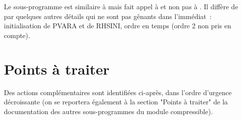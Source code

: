 Le sous-programme  est similaire à  mais fait appel
à  et non pas à .
Il diffère de  par quelques autres détails qui ne sont pas
gênants dans l'immédiat~:
initialisation de PVARA et de RHSINI,
ordre en temps (ordre 2 non pris en compte).

\newpage
\section*{Points à traiter}

Des actions complémentaires sont identifiées ci-après, dans l'ordre
d'urgence décroissante (on se reportera
également à la section "Points à traiter" de la documentation
des autres sous-programmes du module compressible).

